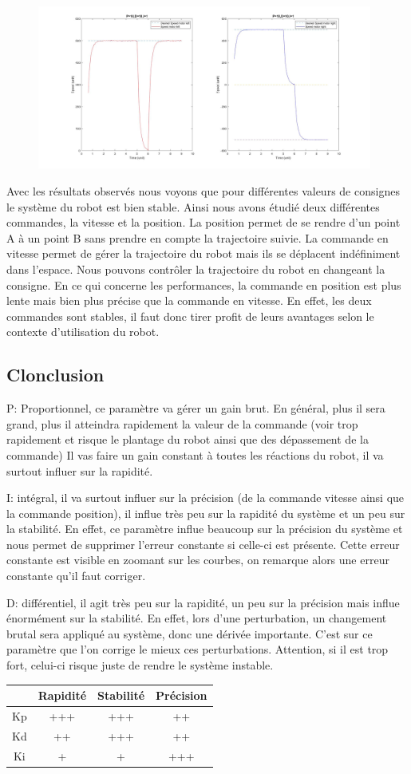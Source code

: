 \documentclass[a4paper]{article}
\begin{document}
		\begin{figure}[h]
			\centering
			\includegraphics[width = 11cm]{imgs/fig10.jpg}
			\caption{}
		\end{figure}
		Avec les résultats observés nous voyons que pour différentes valeurs de consignes le système du robot est bien stable. 
		Ainsi nous avons étudié deux différentes commandes, la vitesse et la position. 
		La position permet de se rendre d’un point A à un point B sans prendre en compte la trajectoire suivie.
		La commande en vitesse permet de gérer la trajectoire du robot mais ils se déplacent indéfiniment dans l’espace. Nous pouvons contrôler la trajectoire du robot en changeant la consigne. 
		En ce qui concerne les performances, la commande en position est plus lente mais bien plus précise que la commande en vitesse. En effet, les deux commandes sont stables, il faut donc tirer profit de leurs avantages selon le contexte d’utilisation du robot. 
		
	
	\subsection{Clonclusion}
	P: Proportionnel, ce paramètre va gérer un gain brut. En général, plus il sera grand, plus il atteindra rapidement
	la valeur de la commande (voir trop rapidement et risque le plantage du robot ainsi que des dépassement de la commande)
	Il vas faire un gain constant à toutes les réactions du robot, il va surtout influer sur la rapidité.
		
	I: intégral, il va surtout influer sur la précision (de la commande vitesse ainsi que la commande position), il influe très peu sur la rapidité du système et un peu sur la stabilité. En effet, ce paramètre influe beaucoup sur la précision du système et nous permet de supprimer l'erreur constante si celle-ci est présente. Cette erreur constante est visible en zoomant sur les courbes, on remarque alors une erreur constante qu'il faut corriger.
	
	D: différentiel, il agit très peu sur la rapidité, un peu sur la précision mais influe énormément sur la stabilité. En effet, lors d'une perturbation, un changement brutal sera appliqué au système, donc une dérivée importante. C'est sur ce paramètre que l'on corrige le mieux ces perturbations.
	Attention, si il est trop fort, celui-ci risque juste de rendre le système instable.
	
	\begin{center}
		\begin{tabular}{||c|c|c|c||}
			\hline
			 & Rapidité & Stabilité & Précision \\[0.5ex]
			\hline \hline
			Kp & +++ & +++ & ++ \\
			\hline
			Kd & ++ & +++ & ++ \\
			\hline
			Ki & + & + & +++\\
			\hline
		\end{tabular}
	\end{center}
\end{document}
